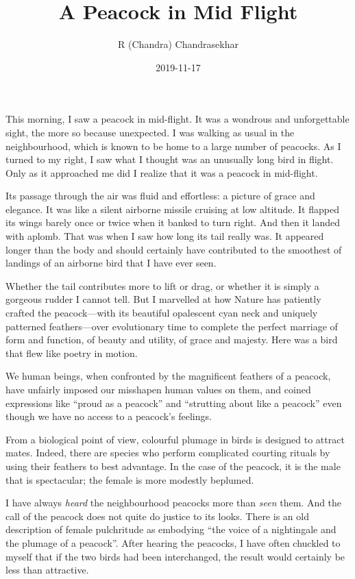 \documentclass[
  a4paper,
]{article}
\title{A Peacock in Mid Flight}
\author{R (Chandra) Chandrasekhar}
\date{2019-11-17}
\begin{document}
\maketitle

\thispagestyle{empty}


This morning, I saw a peacock in mid-flight. It was a wondrous and
unforgettable sight, the more so because unexpected. I was walking as
usual in the neighbourhood, which is known to be home to a large number
of peacocks. As I turned to my right, I saw what I thought was an
unusually long bird in flight. Only as it approached me did I realize
that it was a peacock in mid-flight.

Its passage through the air was fluid and effortless: a picture of grace
and elegance. It was like a silent airborne missile cruising at low
altitude. It flapped its wings barely once or twice when it banked to
turn right. And then it landed with aplomb. That was when I saw how long
its tail really was. It appeared longer than the body and should
certainly have contributed to the smoothest of landings of an airborne
bird that I have ever seen.

Whether the tail contributes more to lift or drag, or whether it is
simply a gorgeous rudder I cannot tell. But I marvelled at how Nature
has patiently crafted the peacock---with its beautiful opalescent cyan
neck and uniquely patterned feathers---over evolutionary time to
complete the perfect marriage of form and function, of beauty and
utility, of grace and majesty. Here was a bird that flew like poetry in
motion.

We human beings, when confronted by the magnificent feathers of a
peacock, have unfairly imposed our misshapen human values on them, and
coined expressions like ``proud as a peacock'' and ``strutting about
like a peacock'' even though we have no access to a peacock's feelings.

From a biological point of view, colourful plumage in birds is designed
to attract mates. Indeed, there are species who perform complicated
courting rituals by using their feathers to best advantage. In the case
of the peacock, it is the male that is spectacular; the female is more
modestly beplumed.

I have always \emph{heard} the neighbourhood peacocks more than
\emph{seen} them. And the call of the peacock does not quite do justice
to its looks. There is an old description of female pulchritude as
embodying ``the voice of a nightingale and the plumage of a peacock''.
After hearing the peacocks, I have often chuckled to myself that if the
two birds had been interchanged, the result would certainly be less than
attractive.
\end{document}
